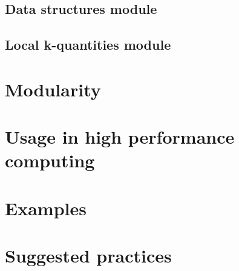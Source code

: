 \documentclass[10pt,a4paper]{article}
\begin{document}
\subsection{Data structures module}\label{sec:data_structures}
\subsection{Local k-quantities module}\label{sec:local_k_quantities}
\section{Modularity}\label{sec:modularity}
\section{Usage in high performance computing}
\section{Examples}
\section{Suggested practices}
\nocite{*}


\end{document}
